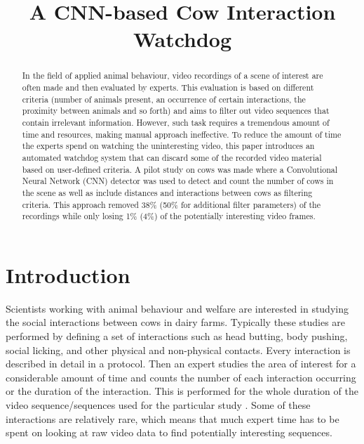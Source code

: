 \documentclass{cta-author}
\begin{document}
\title{A CNN-based Cow Interaction Watchdog}

\author{   }
\address{
}


\begin{abstract}
In the field of applied animal behaviour, video recordings of a scene of interest are often made and then
evaluated by experts. This evaluation is based on different criteria (number of animals present, an
occurrence of certain interactions, the proximity between animals and so forth) and aims to filter out video
sequences that contain irrelevant information.  However,  such task requires a tremendous amount of time and
resources, making manual approach ineffective. To reduce the amount of time the experts spend on watching the
uninteresting video, this paper introduces an automated watchdog system that can discard some of the recorded
video material based on user-defined criteria. A pilot study on cows was made where a Convolutional Neural
Network (CNN) detector was used to detect and count the number of cows in the scene as well as include
distances and interactions between cows as filtering criteria. This approach removed 38\% (50\% for
additional filter parameters) of the recordings while only losing 1\% (4\%) of the potentially interesting
video frames.
\end{abstract}

\maketitle

\section{Introduction}

Scientists working with animal behaviour and welfare are interested in studying the social interactions
between cows in dairy farms. Typically these studies are performed by defining a set of interactions such as
head butting, body pushing, social licking, and other physical and non-physical contacts. Every interaction
is described in detail in a protocol. Then an expert studies the area of interest for a considerable amount
of time and counts the number of each interaction occurring or the duration of the interaction. This is
performed for the whole duration of the video sequence/sequences used for the particular study
\cite{MartinandBateson2007}. Some of these interactions are relatively rare, which means that much expert
time has to be spent on looking at raw video data to find potentially interesting sequences.
\end{document}

